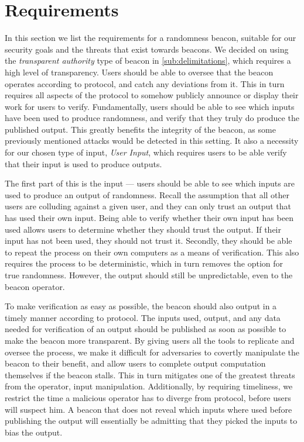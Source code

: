 \section{Requirements}%
\label{sec:beacon_requirements}
In this section we list the requirements for a randomness beacon, suitable for our security goals and the threats that exist towards beacons.
We decided on using the \emph{transparent authority} type of beacon in \cref{sub:delimitations}, which requires a high level of transparency.
Users should be able to oversee that the beacon operates according to protocol, and catch any deviations from it.
This in turn requires all aspects of the protocol to somehow publicly announce or display their work for users to verify.
Fundamentally, users should be able to see which inputs have been used to produce randomness, and verify that they truly do produce the published output.
This greatly benefits the integrity of the beacon, as some previously mentioned attacks would be detected in this setting.
It also a necessity for our chosen type of input, \emph{User Input}, which requires users to be able verify that their input is used to produce outputs.

The first part of this is the input --- users should be able to see which inputs are used to produce an output of randomness.
Recall the assumption that all other users are colluding against a given user, and they can only trust an output that has used their own input.
Being able to verify whether their own input has been used allows users to determine whether they should trust the output.
If their input has not been used, they should not trust it.
Secondly, they should be able to repeat the process on their own computers as a means of verification.
This also requires the process to be deterministic, which in turn removes the option for true randomness.
However, the output should still be unpredictable, even to the beacon operator.

To make verification as easy as possible, the beacon should also output in a timely manner according to protocol.
The inputs used, output, and any data needed for verification of an output should be published as soon as possible to make the beacon more transparent.
By giving users all the tools to replicate and oversee the process, we make it difficult for adversaries to covertly manipulate the beacon to their benefit, and allow users to complete output computation themselves if the beacon stalls.
This in turn mitigates one of the greatest threats from the operator, input manipulation.
Additionally, by requiring timeliness, we restrict the time a malicious operator has to diverge from protocol, before users will suspect him.
A beacon that does not reveal which inputs where used before publishing the output will essentially be admitting that they picked the inputs to bias the output.

